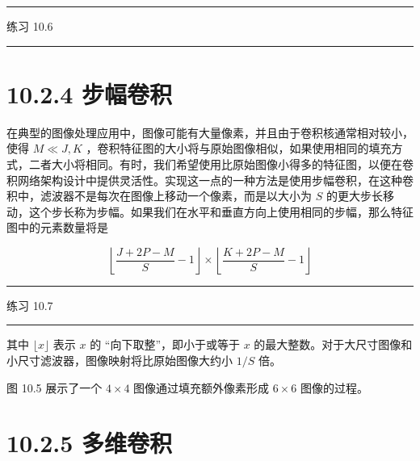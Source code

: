 \documentclass[10pt]{article}
\newcommand{\HRule}{\begin{center}\rule{0.9\linewidth}{0.2mm}\end{center}}
\begin{document}
\HRule

练习 10.6

\HRule

\section*{10.2.4 步幅卷积}

在典型的图像处理应用中，图像可能有大量像素，并且由于卷积核通常相对较小，使得 \(M \ll  J,K\) ，卷积特征图的大小将与原始图像相似，如果使用相同的填充方式，二者大小将相同。有时，我们希望使用比原始图像小得多的特征图，以便在卷积网络架构设计中提供灵活性。实现这一点的一种方法是使用步幅卷积，在这种卷积中，滤波器不是每次在图像上移动一个像素，而是以大小为 \(S\) 的更大步长移动，这个步长称为步幅。如果我们在水平和垂直方向上使用相同的步幅，那么特征图中的元素数量将是

\[
\left\lfloor  {\frac{J + {2P} - M}{S} - 1}\right\rfloor   \times  \left\lfloor  {\frac{K + {2P} - M}{S} - 1}\right\rfloor   \tag{10.5}
\]

\HRule

练习 10.7

\HRule

其中 \(\lfloor x\rfloor\) 表示 \(x\) 的 “向下取整”，即小于或等于 \(x\) 的最大整数。对于大尺寸图像和小尺寸滤波器，图像映射将比原始图像大约小 \(1/S\) 倍。

图 10.5 展示了一个 \(4 \times  4\) 图像通过填充额外像素形成 \(6 \times  6\) 图像的过程。

\begin{center}
\end{center}

\section*{10.2.5 多维卷积}
\end{document}
